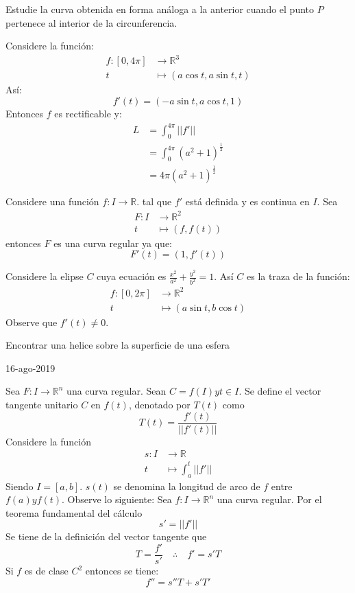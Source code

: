 \begin{problem}
  Estudie la curva obtenida en forma análoga a la  anterior cuando el punto $P$
  pertenece al interior de la circunferencia.
\end{problem}
\begin{example}
  Considere la función:
  \begin{align*}
    f:[0,4\pi] &\to \mathbb{R}^3 \\
    t &\mapsto (a\cos t, a \sin t, t)
  \end{align*}
  Así:
  \[
    f'(t) = (-a \sin t, a \cos t, 1)
  \]
  Entonces $f$ es rectificable y:
  \begin{align*}
    L &= \int_0^{4\pi} ||f'|| \\
      &= \int_0^{4\pi} (a^2 + 1)^{\frac{1}{2}} \\
      &= 4\pi (a^2 + 1)^{\frac{1}{2}}
  \end{align*}
\end{example}
\begin{example}
  Considere una función $f: I \to \mathbb{R}$. tal que $f'$ está definida y es
  continua en $I$. Sea
  \begin{align*}
    F: I &\to \mathbb{R}^2 \\
    t &\mapsto (f, f(t))
  \end{align*}
  entonces $F$ es una curva regular ya que:
  \[
    F'(t) = (1,f'(t)) 
  \]
\end{example}
\begin{example}
  Considere la elipse $C$ cuya ecuación es $ \frac{x^2}{a^2} + \frac{y^2}{b^2}
  =1$. Así $C$ es la traza de la función:
  \begin{align*}
    f:[0, 2\pi] &\to  \mathbb{R}^2 \\
    t & \mapsto (a \sin t, b \cos t)
  \end{align*}
  Observe que $f'(t) \neq 0$.
\end{example}
\begin{problem}
  Encontrar una helice sobre la superficie de una esfera 
\end{problem}
16-ago-2019
\begin{definition}
  Sea $F: I \to \mathbb{R}^n$ una curva regular. Sean $C = f(I) y t \in I$. Se
  define el vector tangente unitario $C$ en $f(t)$, denotado por $T(t)$ como
  \[
    T(t) = \frac{f'(t)}{||f'(t)||}
  \]
  Considere la función 
  \begin{align*}
    s: I & \to \mathbb{R} \\
    t &\mapsto \int_a^t ||f'||
  \end{align*}
  Siendo $I=[a,b]$. $s(t)$ se denomina la longitud de arco de $f$ entre $f(a) y
  f(t)$. Observe lo siguiente: Sea $f: I \to \mathbb{R}^n$ una curva regular.
  Por el teorema fundamental del cálculo
  \[
    s' = ||f'||
  \]
  Se tiene de la definición del vector tangente que 
  \[
    T= \frac{f'}{s'} \quad \therefore \quad f' = s'T
  \]
  Si $f$ es de clase $C^2$ entonces se tiene:
  \begin{equation}\label{eq:2}
    f'' = s''T + s'T'
  \end{equation}
\end{definition}
